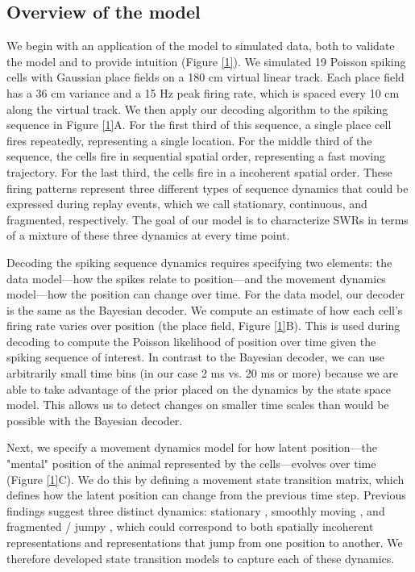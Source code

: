 \documentclass[times, twoside]{zHenriquesLab-StyleBioRxiv}
\begin{document}
\subsection*{Overview of the model}
We begin with an application of the model to simulated data, both to validate the model and to provide intuition (Figure \ref{1}). We simulated 19 Poisson spiking cells with Gaussian place fields on a 180 cm virtual linear track. Each place field has a 36 cm variance and a 15 Hz peak firing rate, which is spaced every 10 cm along the virtual track. We then apply our decoding algorithm to the spiking sequence in Figure \ref{1}A. For the first third of this sequence, a single place cell fires repeatedly, representing a single location. For the middle third of the sequence, the cells fire in sequential spatial order, representing a fast moving trajectory. For the last third, the cells fire in a incoherent spatial order. These firing patterns represent three different types of sequence dynamics that could be expressed during replay events, which we call stationary, continuous, and fragmented, respectively. The goal of our model is to characterize SWRs in terms of a mixture of these three dynamics at every time point.

Decoding the spiking sequence dynamics requires specifying two elements: the data model---how the spikes relate to position---and the movement dynamics model---how the position can change over time. For the data model, our decoder is the same as the Bayesian decoder. We compute an estimate of how each cell's firing rate varies over position (the place field, Figure \ref{1}B). This is used during decoding to compute the Poisson likelihood of position over time given the spiking sequence of interest. In contrast to the Bayesian decoder, we can use arbitrarily small time bins (in our case 2 ms vs. 20 ms or more) because we are able to take advantage of the prior placed on the dynamics by the state space model. This allows us to detect changes on smaller time scales than would be possible with the Bayesian decoder.

Next, we specify a movement dynamics model for how latent position---the "mental" position of the animal represented by the cells---evolves over time (Figure \ref{1}C). We do this by defining a movement state transition matrix, which defines how the latent position can change from the previous time step. Previous findings suggest three distinct dynamics: stationary \cite{JaiDistincthippocampalcorticalmemory2017, FarooqEmergencepreconfiguredplastic2019}, smoothly moving \cite{DavidsonHippocampalReplayExtended2009}, and fragmented / jumpy \cite{PfeifferAutoassociativedynamicsgeneration2015}, which could correspond to both spatially incoherent representations and representations that jump from one position to another. We therefore developed state transition models to capture each of these dynamics.
\end{document}
